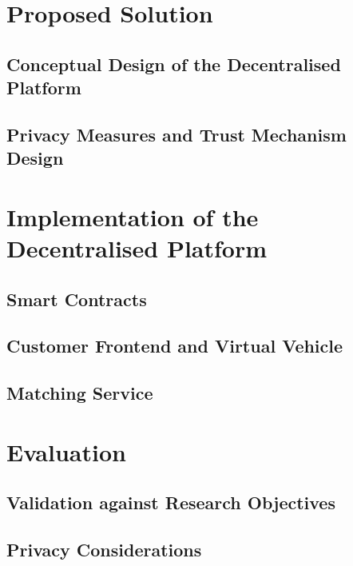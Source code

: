 \documentclass[
  a4paper,  %
  twoside,  %
  bibliography=totoc,
  headsepline,
  cleardoublepage=empty,
  parskip=half,
  draft=false
]{scrbook}
\begin{document}
\chapter{Proposed Solution}\label{chap:ProposedSolution}

\section{Conceptual Design of the Decentralised Platform}\label{sec:DesignOfThePlatform}

\section{Privacy Measures and Trust Mechanism Design}\label{sec:PrivacyAndTrustMechanism}


\chapter{Implementation of the Decentralised Platform}\label{chap:PrototypeImplementation}

\section{Smart Contracts}\label{sec:SmartContracts}

\section{Customer Frontend and Virtual Vehicle}\label{sec:Frontend}

\section{Matching Service}
\label{sec:Matching Service}

\chapter{Evaluation}

\section{Validation against Research Objectives}

\section{Privacy Considerations}

\end{document}
